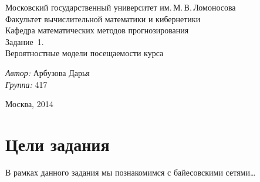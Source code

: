 \documentclass[12pt,a4paper,oneside,fleqn,leqno]{article}
\begin{document}
	\begin{titlepage}
		\begin{center}
			\large Московский государственный университет им.\,М.\,В.\,Ломоносова\\
			Факультет вычислительной математики и кибернетики \\
			Кафедра математических методов прогнозирования \\[4.5cm] 
			\Huge Задание \No\,1.\\Вероятностные модели посещаемости курса\\[5.5cm]
		\end{center}
		\normalsize
		\begin{flushright}
			\emph{Автор:} Арбузова Дарья\\
			\emph{Группа:} 417\\
		\end{flushright}
		\vfill
		\begin{center}
			Москва, 2014
		\end{center}
	\end{titlepage}
	\section{Цели задания}
		В рамках данного задания мы познакомимся с байесовскими сетями…
\end{document}
